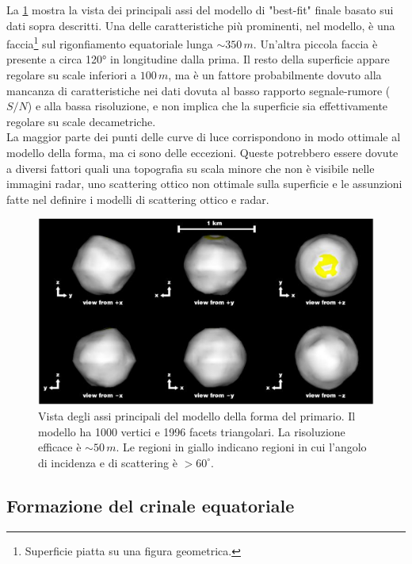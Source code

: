 La \cref{fig:didymos_shape_model} mostra la vista dei principali assi del modello di "best-fit" finale basato sui dati sopra descritti. Una delle caratteristiche più prominenti, nel modello, è una faccia\footnote{Superficie piatta su una figura geometrica.} sul rigonfiamento equatoriale lunga $\sim 350\,m$. Un'altra piccola faccia è presente a circa 120° in longitudine dalla prima. Il resto della superficie appare regolare su scale inferiori a $100\,m$, ma è un fattore probabilmente dovuto alla mancanza di caratteristiche nei dati dovuta al basso rapporto segnale-rumore ($S/N$) e alla bassa risoluzione, e non implica che la superficie sia effettivamente regolare su scale decametriche.\\
La maggior parte dei punti delle curve di luce corrispondono in modo ottimale al modello della forma, ma ci sono delle eccezioni. Queste potrebbero essere dovute a diversi fattori quali una topografia su scala minore che non è visibile nelle immagini radar, uno scattering ottico non ottimale sulla superficie e le assunzioni fatte nel definire i modelli di scattering ottico e radar.

\begin{figure}
    \centering
    \includegraphics[scale=0.78]{figure/didymos_shape_model.jpg}
    \caption[Vista degli assi principali del modello della forma del primario.]{Vista degli assi principali del modello della forma del primario. Il modello ha 1000 vertici e 1996 facets triangolari. La risoluzione efficace è $\sim 50\,m$. Le regioni in giallo indicano regioni in cui l'angolo di incidenza e di scattering è $>60^\circ$. \citep{naidu_radar_2020}}
    \label{fig:didymos_shape_model}
\end{figure}

\subsection{Formazione del crinale equatoriale}\label{sec:eq_ridge}

